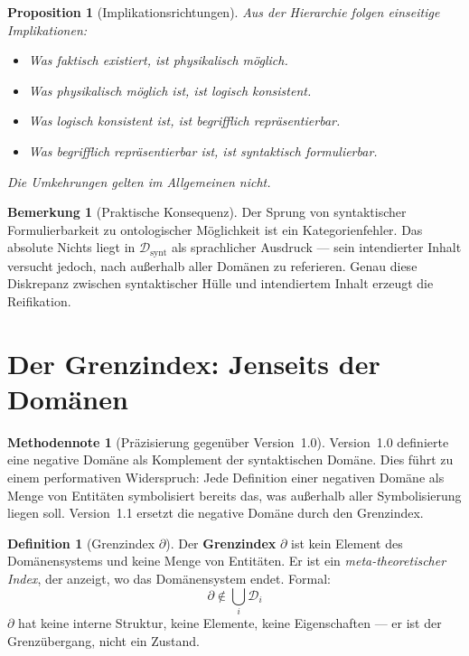 \documentclass[11pt,a4paper]{article}
\theoremstyle{plain}
\newtheorem{proposition}{Proposition}[section]
\theoremstyle{definition}
\newtheorem{definition}{Definition}[section]
\newtheorem{remark}{Bemerkung}[section]
\newtheorem{methodennote}{Methodennote}[section]
\begin{document}
\begin{proposition}[Implikationsrichtungen]
Aus der Hierarchie folgen einseitige Implikationen:
\begin{itemize}
  \item Was faktisch existiert, ist physikalisch m\"{o}glich.
  \item Was physikalisch m\"{o}glich ist, ist logisch konsistent.
  \item Was logisch konsistent ist, ist begrifflich repr\"{a}sentierbar.
  \item Was begrifflich repr\"{a}sentierbar ist, ist syntaktisch formulierbar.
\end{itemize}
Die Umkehrungen gelten im Allgemeinen \emph{nicht}.
\end{proposition}

\begin{remark}[Praktische Konsequenz]
Der Sprung von syntaktischer Formulierbarkeit zu ontologischer M\"{o}glichkeit ist
ein Kategorienfehler. \glqq{}Das absolute Nichts\grqq{} liegt in
$\mathcal{D}_{\mathrm{synt}}$ als sprachlicher Ausdruck --- sein intendierter Inhalt
versucht jedoch, nach au\ss{}erhalb aller Dom\"{a}nen zu referieren. Genau diese
Diskrepanz zwischen syntaktischer H\"{u}lle und intendiertem Inhalt erzeugt die
Reifikation.
\end{remark}

\section{Der Grenzindex: Jenseits der Dom\"{a}nen}

\begin{methodennote}[Pr\"{a}zisierung gegen\"{u}ber Version~1.0]
Version~1.0 definierte eine \glqq{}negative Dom\"{a}ne\grqq{} als Komplement der
syntaktischen Dom\"{a}ne. Dies f\"{u}hrt zu einem performativen Widerspruch: Jede
Definition einer negativen Dom\"{a}ne als Menge von Entit\"{a}ten symbolisiert bereits
das, was au\ss{}erhalb aller Symbolisierung liegen soll. Version~1.1 ersetzt die
negative Dom\"{a}ne durch den Grenzindex.
\end{methodennote}

\begin{definition}[Grenzindex $\partial$]
Der \textbf{Grenzindex} $\partial$ ist kein Element des Dom\"{a}nensystems und keine
Menge von Entit\"{a}ten. Er ist ein \emph{meta-theoretischer Index}, der anzeigt,
wo das Dom\"{a}nensystem endet. Formal:
\[
  \partial \notin \bigcup_{i} \mathcal{D}_{i}
\]
$\partial$ hat keine interne Struktur, keine Elemente, keine Eigenschaften --- er ist
der Grenz\"{u}bergang, nicht ein Zustand.
\end{definition}
\end{document}
